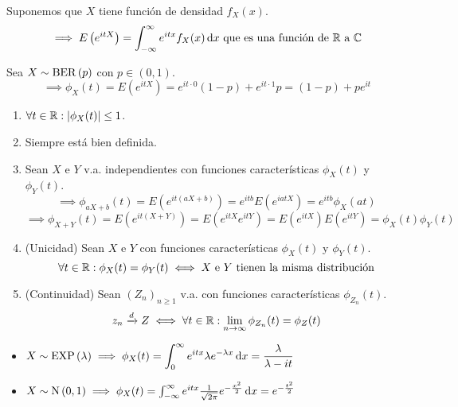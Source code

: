  Suponemos que $X$ tiene función de densidad $f_X(x)$.
\[\implies E\left(e^{itX}\right) = \int_{-\infty}^{\infty} e^{itx}f_X(x)\odif{x} \tex{ que es una función de $\R$ a $\C$}\]

\begin{ejem}
	Sea $X\sim\operatorname{BER}\left(p\right)$ con $p\in(0,1)$.
	\[\implies \phi_X(t) = E\left(e^{itX}\right) = e^{it\cdot 0}(1-p) + e^{it\cdot 1}p = (1-p) + p e^{it}\] %
\end{ejem}

\begin{enumerate}
	\item $\displaystyle \forall t \in \mathbb{R} : \left|\phi_X(t)\right| \leq 1$.
	\item Siempre está bien definida.
	\item Sean $X$ e $Y$ v.a. independientes con funciones características $\phi_X(t)$ y $\phi_Y(t)$.
	      \[\implies \phi_{aX+b}(t) = E\left(e^{it(aX+b)}\right) = e^{itb}E\left(e^{iatX}\right) = e^{itb}\phi_X(at)\]
	      \[\implies \phi_{X+Y}(t) = E\left(e^{it(X+Y)}\right) = E\left(e^{itX}e^{itY}\right) = E\left(e^{itX}\right)E\left(e^{itY}\right) = \phi_X(t)\phi_Y(t)\]
	\item (Unicidad) Sean $X$ e $Y$ con funciones características $\phi_X(t)$ y $\phi_Y(t)$.
	      \[\forall t \in \mathbb{R} :  \phi_X(t) = \phi_Y(t) \iff \text{$X$ e $Y$ tienen la misma distribución}\]
	\item (Continuidad) Sean $\left(Z_n\right)_{n\geq 1}$ v.a. con funciones características $\phi_{Z_n}(t)$.
	      \[z_n \xrightarrow{d} Z \iff \forall t \in \mathbb{R} : \lim_{n\to\infty} \phi_{Z_n}(t) = \phi_Z(t)\]
\end{enumerate}

\begin{ejem}
	\begin{itemize} %
		\item $\ds X\sim\EXP{\lambda} \implies \phi_X(t) = \int_{0}^{\infty} e^{itx}\lambda e^{-\lambda x}\odif{x} = \frac{\lambda}{\lambda - it}$
		\item $X\sim\normal{0,1} \implies \phi_X(t) = \int_{-\infty}^{\infty} e^{itx}\frac{1}{\sqrt{2\pi}}e^{-\frac{x^2}{2}}\odif{x} = e^{-\frac{t^2}{2}}$
	\end{itemize}
\end{ejem}

